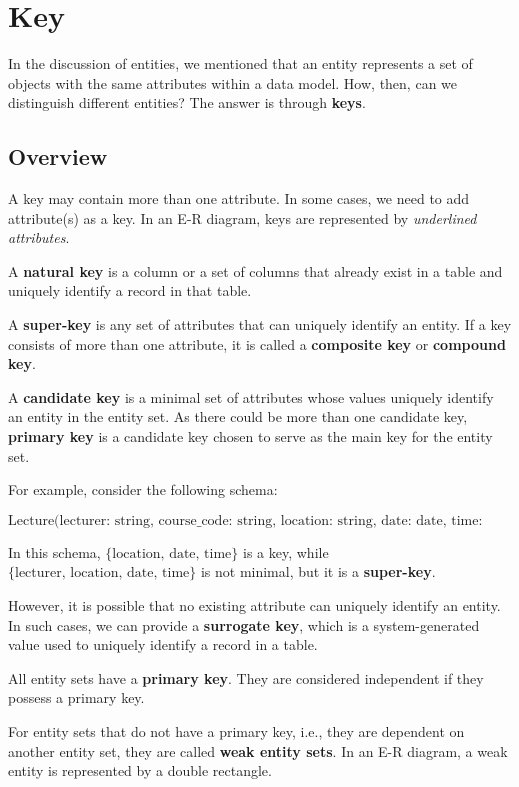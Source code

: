 \section{Key}
In the discussion of entities, we mentioned that an entity represents a set of objects with the same attributes within a data model. How, then, can we distinguish different entities? The answer is through \textbf{keys}.  

\subsection{Overview}
A key may contain more than one attribute. In some cases, we need to add attribute(s) as a key. In an E-R diagram, keys are represented by \emph{underlined attributes}.  

A \textbf{natural key} is a column or a set of columns that already exist in a table and uniquely identify a record in that table.  

A \textbf{super-key} is any set of attributes that can uniquely identify an entity. If a key consists of more than one attribute, it is called a \textbf{composite key} or \textbf{compound key}. 

A \textbf{candidate key} is a minimal set of attributes whose values uniquely identify an entity in the entity set. As there could be more than one candidate key, \textbf{primary key} is a candidate key chosen to serve as the main key for the entity set.  

For example, consider the following schema:  

\[
\text{Lecture(lecturer: string, course\_code: string, location: string, date: date, time: string)}
\]  

In this schema, \(\{ \text{location, date, time} \}\) is a key, while \(\{ \text{lecturer, location, date, time} \}\) is not minimal, but it is a \textbf{super-key}.  

However, it is possible that no existing attribute can uniquely identify an entity. In such cases, we can provide a \textbf{surrogate key}, which is a system-generated value used to uniquely identify a record in a table.

All entity sets have a \textbf{primary key}. They are considered independent if they possess a primary key.  

For entity sets that do not have a primary key, i.e., they are dependent on another entity set, they are called \textbf{weak entity sets}. In an E-R diagram, a weak entity is represented by a double rectangle.  

